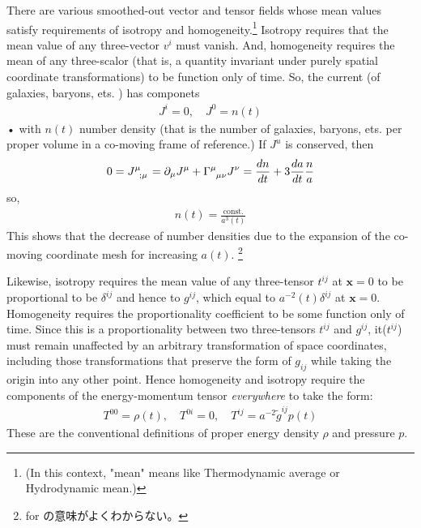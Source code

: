 \documentclass[11pt,a4paper,dvipdfmx]{jsarticle}
\theoremstyle{plain}
\theoremstyle{break}
\newcommand{\mbx}{\mathbf{x}}
\newcommand{\tilg}{\tilde{g}}
\begin{document}
There are various smoothed-out vector and tensor fields whose mean values satisfy requirements of isotropy and homogeneity.\footnote{(In this context, "mean" means like Thermodynamic average or Hydrodynamic mean.)}
Isotropy requires that the mean value of any three-vector $v^i$ must vanish.
And, homogeneity requires the mean of any three-scalor (that is, a quantity invariant under purely spatial coordinate transformations) to be function only of time.
So, the current (of galaxies, baryons, ets. ) has componets
\begin{align}
J^i =0 ,\quad J^0 = n(t)
\end{align}•%
with $n(t)$ number density (that is the number of galaxies, baryons, ets. per proper volume in a co-moving frame of reference.)
If $J^u$ is conserved, then
\begin{align}
0= \tensor{J}{^\mu_{;\mu}} = \partial_\mu J^\mu + \tensor{\Gamma}{^\mu_{\mu \nu}} J^\nu= \frac{dn}{dt} + 3\frac{da}{dt} \frac{n}{a}
\end{align}
so,
\begin{align}
n(t) = \frac{\mathrm{const.}}{a^3(t)}
\end{align}
This shows that  the decrease of number densities due to the expansion of the co-moving coordinate mesh for increasing $a(t)$.
\footnote{for の意味がよくわからない。}

Likewise, isotropy requires the mean value of any three-tensor $t^{ij}$ at $\mbx=0$ to be proportional to be $\delta^{ij}$ and hence to $g^{ij}$, which equal to $a^{-2}(t) \delta^{ij}$ at $\mbx=0$.
Homogeneity requires the proportionality coefficient to be some function only of time.
Since this is a proportionality between two three-tensors $t^{ij}$ and $g^{ij}$,
it($t^{ij}$) must remain unaffected by an arbitrary transformation of space coordinates, including those transformations that preserve the form of $g_{ij}$ while taking the origin into any other point.
Hence homogeneity and isotropy require the components of the energy-momentum tensor \textit{everywhere} to take the form:
\begin{align}
  T^{00} = \rho(t),\quad T^{0i} = 0,\quad T^{ij} = a^{-2} \tilg^{ij} p(t)
\end{align}
These are the conventional definitions of proper energy density $\rho$ and pressure $p$.
\end{document}
